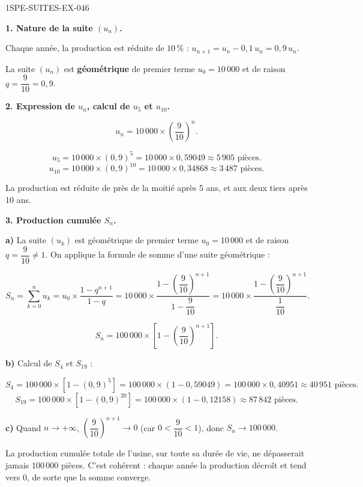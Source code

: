 \begin{corrige}{1SPE-SUITES-EX-046}

\textbf{1. Nature de la suite $(u_n)$.}

Chaque année, la production est réduite de $10\,\%$ : $u_{n+1} = u_n - 0{,}1\,u_n = 0{,}9\,u_n$.


La suite $(u_n)$ est \textbf{géométrique} de premier terme $u_0 = 10\,000$ et de raison $q = \dfrac{9}{10} = 0{,}9$.

\textbf{2. Expression de $u_n$, calcul de $u_5$ et $u_{10}$.}

\[
u_n = 10\,000 \times \left(\frac{9}{10}\right)^n.
\]

\[
u_5 = 10\,000 \times (0{,}9)^5 = 10\,000 \times 0{,}59049 \approx 5\,905 \text{ pièces.}
\]
\[
u_{10} = 10\,000 \times (0{,}9)^{10} = 10\,000 \times 0{,}34868 \approx 3\,487 \text{ pièces.}
\]

La production est réduite de près de la moitié après 5 ans, et aux deux tiers après 10 ans.

\textbf{3. Production cumulée $S_n$.}

\textbf{a)} La suite $(u_k)$ est géométrique de premier terme $u_0 = 10\,000$ et de raison $q = \dfrac{9}{10} \neq 1$. On applique la formule de somme d'une suite géométrique :

\[
S_n = \sum_{k=0}^{n} u_k = u_0 \times \frac{1 - q^{n+1}}{1 - q} = 10\,000 \times \frac{1 - \left(\dfrac{9}{10}\right)^{n+1}}{1 - \dfrac{9}{10}} = 10\,000 \times \frac{1 - \left(\dfrac{9}{10}\right)^{n+1}}{\dfrac{1}{10}}.
\]

\[
\boxed{S_n = 100\,000 \times \left[1 - \left(\frac{9}{10}\right)^{n+1}\right].}
\]

\textbf{b)} Calcul de $S_4$ et $S_{19}$ :

\[
S_4 = 100\,000 \times \left[1 - (0{,}9)^5\right] = 100\,000 \times (1 - 0{,}59049) = 100\,000 \times 0{,}40951 \approx 40\,951 \text{ pièces.}
\]
\[
S_{19} = 100\,000 \times \left[1 - (0{,}9)^{20}\right] = 100\,000 \times (1 - 0{,}12158) \approx 87\,842 \text{ pièces.}
\]

\textbf{c)} Quand $n \to +\infty$, $\left(\dfrac{9}{10}\right)^{n+1} \to 0$ (car $0 < \dfrac{9}{10} < 1$), donc $S_n \to 100\,000$.

La production cumulée totale de l'usine, sur toute sa durée de vie, ne dépasserait jamais $100\,000$ pièces. C'est cohérent : chaque année la production décroît et tend vers $0$, de sorte que la somme converge.


\end{corrige}
